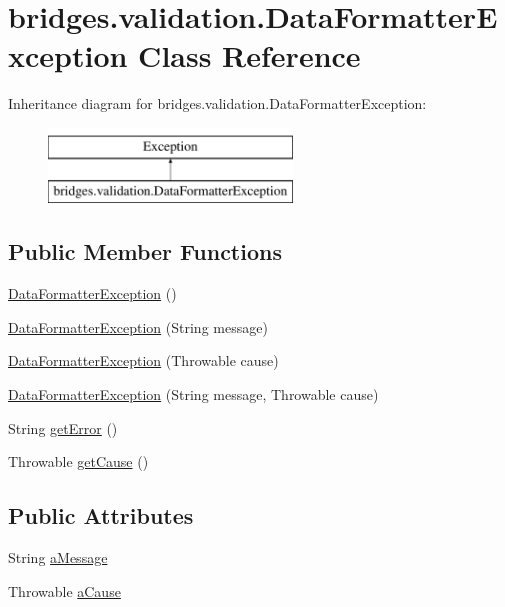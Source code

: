 \hypertarget{classbridges_1_1validation_1_1_data_formatter_exception}{}\section{bridges.\+validation.\+Data\+Formatter\+Exception Class Reference}
\label{classbridges_1_1validation_1_1_data_formatter_exception}
Inheritance diagram for bridges.\+validation.\+Data\+Formatter\+Exception\+:\begin{figure}[H]
\begin{center}
\leavevmode
\includegraphics[height=2.000000cm]{classbridges_1_1validation_1_1_data_formatter_exception}
\end{center}
\end{figure}
\subsection*{Public Member Functions}
\begin{DoxyCompactItemize}
\item 
\hyperlink{classbridges_1_1validation_1_1_data_formatter_exception_aa922b9fa359b89c0b25eaa1efd0cfd07}{Data\+Formatter\+Exception} ()
\item 
\hyperlink{classbridges_1_1validation_1_1_data_formatter_exception_abadd66eb3ea98c1af1ff397912ed73bf}{Data\+Formatter\+Exception} (String message)
\item 
\hyperlink{classbridges_1_1validation_1_1_data_formatter_exception_ae7ce6479c3caf8077d5e34b79fe980dd}{Data\+Formatter\+Exception} (Throwable cause)
\item 
\hyperlink{classbridges_1_1validation_1_1_data_formatter_exception_acaec0fe0a826d08481207a3bac21c913}{Data\+Formatter\+Exception} (String message, Throwable cause)
\item 
String \hyperlink{classbridges_1_1validation_1_1_data_formatter_exception_ad60457ab04769d2c80e6ba77a6307ce1}{get\+Error} ()
\item 
Throwable \hyperlink{classbridges_1_1validation_1_1_data_formatter_exception_a6223e92ea95f3050d532997cb115cf2a}{get\+Cause} ()
\end{DoxyCompactItemize}
\subsection*{Public Attributes}
\begin{DoxyCompactItemize}
\item 
String \hyperlink{classbridges_1_1validation_1_1_data_formatter_exception_a8cab4688a8a80a0575bcda28e6ac7b8c}{a\+Message}
\item 
Throwable \hyperlink{classbridges_1_1validation_1_1_data_formatter_exception_ad2fdeb878690d9fc23f1316f55696ffd}{a\+Cause}
\end{DoxyCompactItemize}


